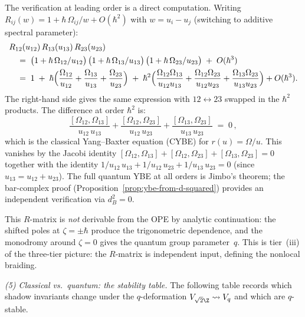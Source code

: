 \begin{conjecture}
The verification at leading order is a direct
computation. Writing $R_{ij}(w) = 1 + \hbar\,\Omega_{ij}/w
+ O(\hbar^2)$ with $w = u_i - u_j$
(switching to additive spectral parameter):
\begin{align*}
&R_{12}(u_{12})\,R_{13}(u_{13})\,R_{23}(u_{23})
\\
&\quad =\; \bigl(1 + \hbar\,\Omega_{12}/u_{12}\bigr)\,
\bigl(1 + \hbar\,\Omega_{13}/u_{13}\bigr)\,
\bigl(1 + \hbar\,\Omega_{23}/u_{23}\bigr)
\;+\; O(\hbar^3)
\\
&\quad =\; 1 \;+\; \hbar\Bigl(
\frac{\Omega_{12}}{u_{12}} + \frac{\Omega_{13}}{u_{13}}
+ \frac{\Omega_{23}}{u_{23}}\Bigr)
\;+\; \hbar^2\Bigl(
\frac{\Omega_{12}\Omega_{13}}{u_{12}u_{13}}
+ \frac{\Omega_{12}\Omega_{23}}{u_{12}u_{23}}
+ \frac{\Omega_{13}\Omega_{23}}{u_{13}u_{23}}\Bigr)
+ O(\hbar^3).
\end{align*}
The right-hand side gives the same expression with
$12 \leftrightarrow 23$ swapped in the $\hbar^2$ products.
The difference at order $\hbar^2$ is:
\[
\frac{[\Omega_{12},\Omega_{13}]}{u_{12}\,u_{13}}
+ \frac{[\Omega_{12},\Omega_{23}]}{u_{12}\,u_{23}}
+ \frac{[\Omega_{13},\Omega_{23}]}{u_{13}\,u_{23}}
\;=\; 0\,,
\]
which is the classical Yang--Baxter equation (CYBE)
for $r(u) = \Omega/u$. This vanishes by the Jacobi identity
$[\Omega_{12},\Omega_{13}] + [\Omega_{12},\Omega_{23}]
+ [\Omega_{13},\Omega_{23}] = 0$
together with the identity
$1/u_{12}\,u_{13} + 1/u_{12}\,u_{23} + 1/u_{13}\,u_{23} = 0$
(since $u_{13} = u_{12} + u_{23}$).
The full quantum YBE at all orders is Jimbo's theorem;
the bar-complex proof
(Proposition~\ref{prop:ybe-from-d-squared}) provides an
independent verification via $d_B^2 = 0$.

This $R$-matrix is \emph{not} derivable from
the OPE by analytic continuation: the shifted poles at
$\zeta = \pm\hbar$ produce the trigonometric dependence, and
the monodromy around $\zeta = 0$ gives the quantum group
parameter~$q$. This is tier~(iii) of the three-tier
picture: the $R$-matrix is independent input, defining
the nonlocal braiding.

\smallskip
\noindent
\emph{(5) Classical vs.\ quantum: the stability table.}
The following table records which shadow invariants
change under the $q$-deformation $V_{\sqrt{2}\Z}
\rightsquigarrow V_q$ and which are $q$-stable.


\end{conjecture}
